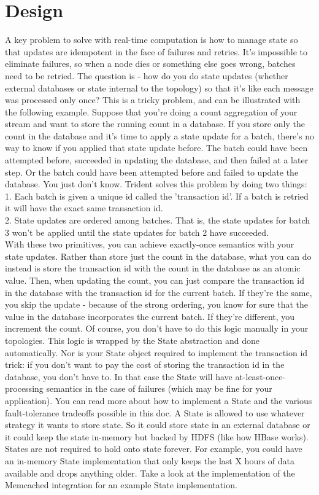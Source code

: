 \chapter{Design} 
\thispagestyle{plain} 
A key problem to solve with real-time computation is how to manage state so that updates are idempotent in the face of failures and retries. It's impossible to eliminate failures, so when a node dies or something else goes wrong, batches need to be retried. The question is - how do you do state updates (whether external databases or state internal to the topology) so that it's like each message was processed only once?
This is a tricky problem, and can be illustrated with the following example. Suppose that you're doing a count aggregation of your stream and want to store the running count in a database. If you store only the count in the database and it's time to apply a state update for a batch, there's no way to know if you applied that state update before. The batch could have been attempted before, succeeded in updating the database, and then failed at a later step. Or the batch could have been attempted before and failed to update the database. You just don't know.
Trident solves this problem by doing two things:\\[2mm]
1. Each batch is given a unique id called the 'transaction id'. If a batch is retried it will have the exact same transaction id.\\[2mm]
2. State updates are ordered among batches. That is, the state updates for batch 3 won't be applied until the state updates for batch 2 have succeeded.\\[2mm]
With these two primitives, you can achieve exactly-once semantics with your state updates. Rather than store just the count in the database, what you can do instead is store the transaction id with the count in the database as an atomic value. Then, when updating the count, you can just compare the transaction id in the database with the transaction id for the current batch. If they're the same, you skip the update - because of the strong ordering, you know for sure that the value in the database incorporates the current batch. If they're different, you increment the count.
Of course, you don't have to do this logic manually in your topologies. This logic is wrapped by the State abstraction and done automatically. Nor is your State object required to implement the transaction id trick: if you don't want to pay the cost of storing the transaction id in the database, you don't have to. In that case the State will have at-least-once-processing semantics in the case of failures (which may be fine for your application). You can read more about how to implement a State and the various fault-tolerance tradeoffs possible in this doc.
A State is allowed to use whatever strategy it wants to store state. So it could store state in an external database or it could keep the state in-memory but backed by HDFS (like how HBase works). States are not required to hold onto state forever. For example, you could have an in-memory State implementation that only keeps the last X hours of data available and drops anything older. Take a look at the implementation of the Memcached integration for an example State implementation.
